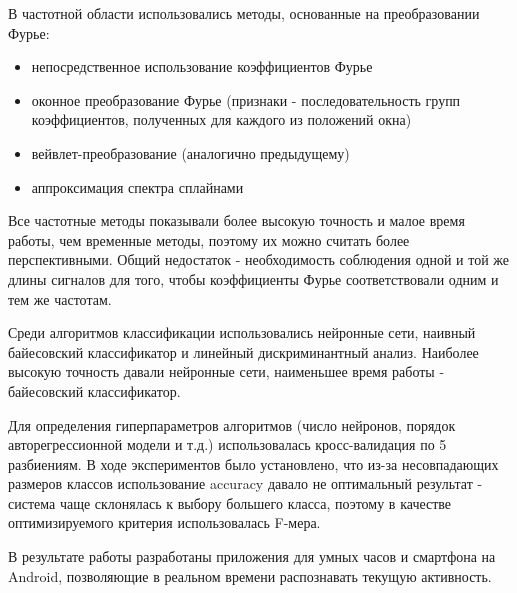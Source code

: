 В частотной области использовались методы, основанные на преобразовании Фурье:
\begin{itemize}
\item непосредственное использование коэффициентов Фурье
\item оконное преобразование Фурье (признаки - последовательность групп коэффициентов, полученных для каждого из положений окна)
\item вейвлет-преобразование (аналогично предыдущему)
\item аппроксимация спектра сплайнами
\end{itemize}
Все частотные методы показывали более высокую точность и малое время работы, чем временные методы, поэтому их можно считать более перспективными. Общий недостаток - необходимость соблюдения одной и той же длины сигналов для того, чтобы коэффициенты Фурье соответствовали одним и тем же частотам.

Среди алгоритмов классификации использовались нейронные сети, наивный байесовский классификатор и линейный дискриминантный анализ. Наиболее высокую точность давали нейронные сети, наименьшее время работы - байесовский классификатор.

Для определения гиперпараметров алгоритмов (число нейронов, порядок авторегрессионной модели и т.д.) использовалась кросс-валидация по 5 разбиениям. В ходе экспериментов было установлено, что из-за несовпадающих размеров классов использование accuracy давало не оптимальный результат - система чаще склонялась к выбору большего класса, поэтому в качестве оптимизируемого критерия использовалась F-мера.


В результате работы разработаны приложения для умных часов и смартфона на Android, позволяющие в реальном времени распознавать текущую активность.



